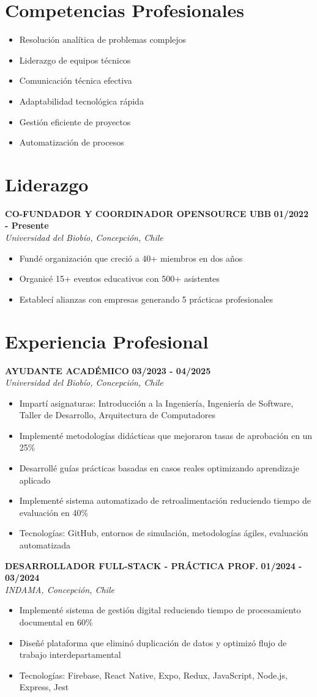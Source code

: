\documentclass[10pt, letterpaper]{article}
\newcommand{\experiencia}[4]{
    {\bfseries\color{primario}#1} \hfill {\footnotesize\textbf{#2}}\\[0.05cm]
    {\footnotesize\textit{#3, #4}}\\[0.1cm]
}
\newcommand{\logro}[1]{
    \item {\footnotesize #1}
}
\begin{document}
\begin{multicols}{2}
\section*{Competencias Profesionales}
\begin{itemize}
    \logro{Resolución analítica de problemas complejos}
    \logro{Liderazgo de equipos técnicos}
    \logro{Comunicación técnica efectiva}
    \logro{Adaptabilidad tecnológica rápida}
    \logro{Gestión eficiente de proyectos}
    \logro{Automatización de procesos}
\end{itemize}

\section*{Liderazgo}
\experiencia{CO-FUNDADOR Y COORDINADOR OPENSOURCE UBB}{01/2022 - Presente}
{Universidad del Biobío}{Concepción, Chile}
\begin{itemize}
    \logro{Fundé organización que creció a 40+ miembros en dos años}
    \logro{Organicé 15+ eventos educativos con 500+ asistentes}
    \logro{Establecí alianzas con empresas generando 5 prácticas profesionales}
\end{itemize}

\columnbreak

\section*{Experiencia Profesional}

\experiencia{AYUDANTE ACADÉMICO}{03/2023 - 04/2025}
{Universidad del Biobío}{Concepción, Chile}
\begin{itemize}
    \logro{Impartí asignaturas: Introducción a la Ingeniería, Ingeniería de Software, Taller de Desarrollo, Arquitectura de Computadores}
    \logro{Implementé metodologías didácticas que mejoraron tasas de aprobación en un 25\%}
    \logro{Desarrollé guías prácticas basadas en casos reales optimizando aprendizaje aplicado}
    \logro{Implementé sistema automatizado de retroalimentación reduciendo tiempo de evaluación en 40\%}
    \logro{Tecnologías: GitHub, entornos de simulación, metodologías ágiles, evaluación automatizada}
\end{itemize}

\experiencia{DESARROLLADOR FULL-STACK - PRÁCTICA PROF.}{01/2024 - 03/2024}
{INDAMA}{Concepción, Chile}
\begin{itemize}
    \logro{Implementé sistema de gestión digital reduciendo tiempo de procesamiento documental en 60\%}
    \logro{Diseñé plataforma que eliminó duplicación de datos y optimizó flujo de trabajo interdepartamental}
    \logro{Tecnologías: Firebase, React Native, Expo, Redux, JavaScript, Node.js, Express, Jest}
\end{itemize}


\end{multicols}
\end{document}
